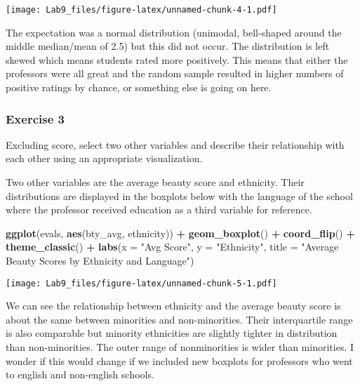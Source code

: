 \documentclass[
]{article}
\newenvironment{Shaded}{\begin{snugshade}}{\end{snugshade}}
\newcommand{\DataTypeTok}[1]{\textcolor[rgb]{0.13,0.29,0.53}{#1}}
\newcommand{\KeywordTok}[1]{\textcolor[rgb]{0.13,0.29,0.53}{\textbf{#1}}}
\newcommand{\NormalTok}[1]{#1}
\newcommand{\OperatorTok}[1]{\textcolor[rgb]{0.81,0.36,0.00}{\textbf{#1}}}
\newcommand{\StringTok}[1]{\textcolor[rgb]{0.31,0.60,0.02}{#1}}
\begin{document}
\texttt{[image: Lab9\_files/figure-latex/unnamed-chunk-4-1.pdf]}

The expectation was a normal distribution (unimodal, bell-shaped around
the middle median/mean of 2.5) but this did not occur. The distribution
is left skewed which means students rated more positively. This means
that either the professors were all great and the random sample resulted
in higher numbers of positive ratings by chance, or something else is
going on here.

\hypertarget{exercise-3}{%
\subsubsection{Exercise 3}\label{exercise-3}}

Excluding score, select two other variables and describe their
relationship with each other using an appropriate visualization.

Two other variables are the average beauty score and ethnicity. Their
distributions are displayed in the boxplots below with the language of
the school where the professor received education as a third variable
for reference.

\begin{Shaded}
\begin{Highlighting}[]
\KeywordTok{ggplot}\NormalTok{(evals, }\KeywordTok{aes}\NormalTok{(bty_avg, ethnicity)) }\OperatorTok{+}\StringTok{ }\KeywordTok{geom_boxplot}\NormalTok{() }\OperatorTok{+}\StringTok{ }\KeywordTok{coord_flip}\NormalTok{() }\OperatorTok{+}\StringTok{ }\KeywordTok{theme_classic}\NormalTok{() }\OperatorTok{+}\StringTok{ }\KeywordTok{labs}\NormalTok{(}\DataTypeTok{x =} \StringTok{"Avg Score"}\NormalTok{, }\DataTypeTok{y =} \StringTok{"Ethnicity"}\NormalTok{, }\DataTypeTok{title =} \StringTok{"Average Beauty Scores by Ethnicity and Language"}\NormalTok{)}
\end{Highlighting}
\end{Shaded}

\texttt{[image: Lab9\_files/figure-latex/unnamed-chunk-5-1.pdf]}

We can see the relationship between ethnicity and the average beauty
score is about the same between minorities and non-minorities. Their
interquartile range is also comparable but minority ethnicities are
slightly tighter in distribution than non-minorities. The outer range of
nonminorities is wider than minorities. I wonder if this would change if
we included new boxplots for professors who went to english and
non-english schools.
\end{document}
